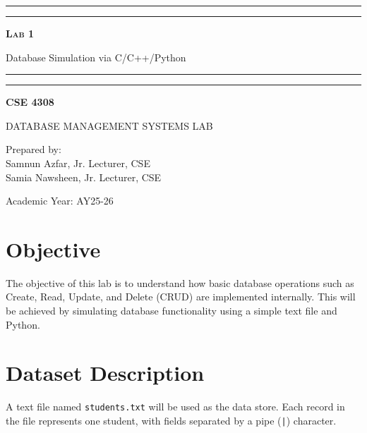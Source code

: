 \documentclass[12pt,a4paper]{article}
\begin{document}
\begin{titlepage}
    \centering
    \vspace*{2\baselineskip}

    \rule{14cm}{2pt}\vspace*{-0.8\baselineskip}\vspace*{1.5pt}
    \rule{14cm}{0.5pt}\vspace{2\baselineskip}

    {\Huge\bfseries\scshape Lab 1\par}
    \vspace{3mm}
    {\Large Database Simulation via C/C++/Python}
    \vspace{3mm}

    \rule{14cm}{0.5pt}\vspace*{-0.7\baselineskip}\vspace{2.5pt}
    \rule{14cm}{2pt}

    \vspace{2\baselineskip}

    {\Large\bfseries CSE 4308\par}
    \vspace{1\baselineskip}
    {\large DATABASE MANAGEMENT SYSTEMS LAB\par}

    \vfill
    {\normalsize Prepared by:\\ Samnun Azfar, Jr. Lecturer, CSE\\ Samia Nawsheen, Jr. Lecturer, CSE\par}
    {\normalsize Academic Year: AY25-26\par}
\end{titlepage}

\newpage

\section{Objective}
The objective of this lab is to understand how basic database operations such as Create, Read, Update, and Delete (CRUD) are implemented internally. This will be achieved by simulating database functionality using a simple text file and Python.

\section{Dataset Description}
A text file named \texttt{students.txt} will be used as the data store. Each record in the file represents one student, with fields separated by a pipe (\texttt{|}) character.
\end{document}
